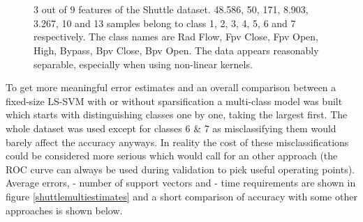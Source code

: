 \vspace{0.5cm}
\begin{figure}[htb]
\centering
%
\\
\\
\caption{3 out of 9 features of the Shuttle dataset. 48.586, 50, 171, 8.903, 3.267, 10 and 13 samples belong to class 1, 2, 3, 4, 5, 6 and 7 respectively. The class names are Rad Flow, Fpv Close, Fpv Open, High, Bypass, Bpv Close, Bpv Open. The data appears reasonably separable, especially when using non-linear kernels.}
\label{shuttlehist}
\end{figure}

To get more meaningful error estimates and an overall comparison between a fixed-size LS-SVM with or without sparsification a multi-class model was built which starts with distinguishing classes one by one, taking the largest first. The whole dataset was used except for classes 6 \& 7 as misclassifying them would barely affect the accuracy anyways. In reality the cost of these misclassifications could be considered more serious which would call for an other approach (the ROC curve can always be used during validation to pick useful operating points). Average errors, - number of support vectors and - time requirements are shown in figure \ref{shuttlemultiestimates} and a short comparison of accuracy with some other approaches is shown below.

